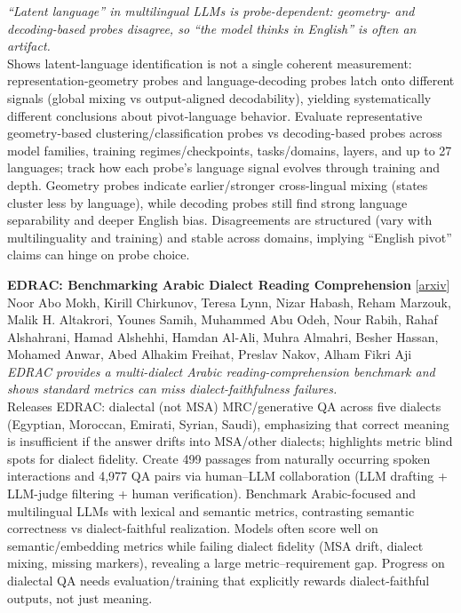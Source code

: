 \documentclass[12pt,letterpaper]{article}
\begin{document}
{\small\textit{``Latent language'' in multilingual LLMs is probe-dependent: geometry- and decoding-based probes disagree, so ``the model thinks in English'' is often an artifact.}}\\[1pt]
{\footnotesize Shows latent-language identification is not a single coherent measurement: representation-geometry probes and language-decoding probes latch onto different signals (global mixing vs output-aligned decodability), yielding systematically different conclusions about pivot-language behavior. Evaluate representative geometry-based clustering/classification probes vs decoding-based probes across model families, training regimes/checkpoints, tasks/domains, layers, and up to 27 languages; track how each probe's language signal evolves through training and depth. Geometry probes indicate earlier/stronger cross-lingual mixing (states cluster less by language), while decoding probes still find strong language separability and deeper English bias. Disagreements are structured (vary with multilinguality and training) and stable across domains, implying ``English pivot'' claims can hinge on probe choice.}

\medskip

{\small\textbf{EDRAC: Benchmarking Arabic Dialect Reading Comprehension}} {\scriptsize[\href{https://arxiv.org/abs/2609.01113}{arxiv}]}\\
{\scriptsize Noor Abo Mokh, Kirill Chirkunov, Teresa Lynn, Nizar Habash, Reham Marzouk, Malik H. Altakrori, Younes Samih, Muhammed Abu Odeh, Nour Rabih, Rahaf Alshahrani, Hamad Alshehhi, Hamdan Al-Ali, Muhra Almahri, Besher Hassan, Mohamed Anwar, Abed Alhakim Freihat, Preslav Nakov, Alham Fikri Aji}\\

{\small\textit{EDRAC provides a multi-dialect Arabic reading-comprehension benchmark and shows standard metrics can miss dialect-faithfulness failures.}}\\[1pt]
{\footnotesize Releases EDRAC: dialectal (not MSA) MRC/generative QA across five dialects (Egyptian, Moroccan, Emirati, Syrian, Saudi), emphasizing that correct meaning is insufficient if the answer drifts into MSA/other dialects; highlights metric blind spots for dialect fidelity. Create 499 passages from naturally occurring spoken interactions and 4,977 QA pairs via human--LLM collaboration (LLM drafting + LLM-judge filtering + human verification). Benchmark Arabic-focused and multilingual LLMs with lexical and semantic metrics, contrasting semantic correctness vs dialect-faithful realization. Models often score well on semantic/embedding metrics while failing dialect fidelity (MSA drift, dialect mixing, missing markers), revealing a large metric--requirement gap. Progress on dialectal QA needs evaluation/training that explicitly rewards dialect-faithful outputs, not just meaning.}
\end{document}
